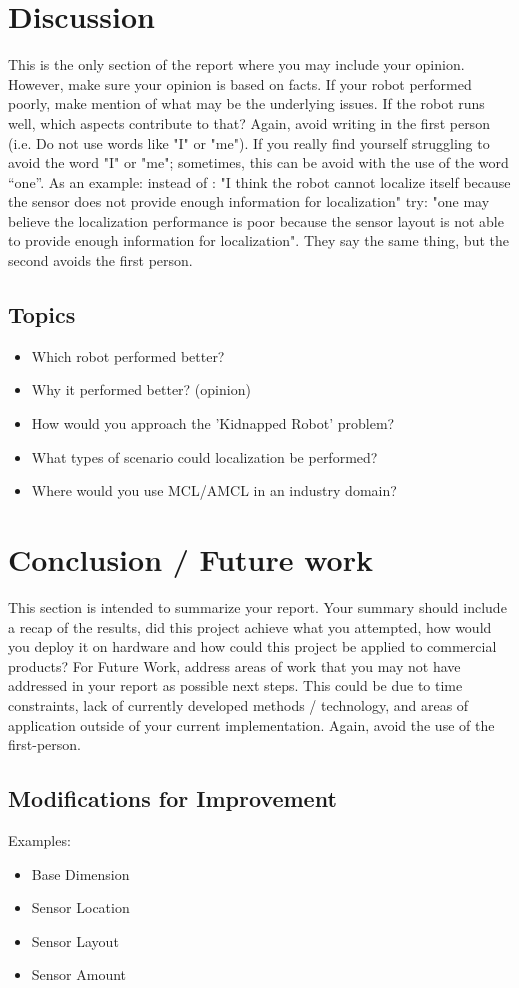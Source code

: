 \documentclass[10pt,journal,compsoc]{IEEEtran}
\begin{document}
\section{Discussion}
This is the only section of the report where you may include your opinion. However, make sure your opinion is based on facts. If your robot performed poorly, make mention of what may be the underlying issues. If the robot runs well, which aspects contribute to that? Again, avoid writing in the first person (i.e. Do not use words like "I" or "me"). If you really find yourself struggling to avoid the word "I" or "me"; sometimes, this can be avoid with the use of the word “one”. As an example: instead of : "I think the robot cannot localize itself because the sensor does not provide enough information for localization" try: "one may believe the localization performance is poor because the sensor layout is not able to provide enough information for localization". They say the same thing, but the second avoids the first person. 

\subsection{Topics}
\begin{itemize}
\item Which robot performed better?
\item Why it performed better? (opinion)
\item How would you approach the 'Kidnapped Robot' problem?
\item What types of scenario could localization be performed?
\item Where would you use MCL/AMCL in an industry domain?
\end {itemize}

\section{Conclusion / Future work}
This section is intended to summarize your report. Your summary should include a recap of the results, did this project achieve what you attempted, how would you deploy it on hardware and how could this project be applied to commercial products? 
For Future Work, address areas of work that you may not have addressed in your report as possible next steps. This could be due to time constraints, lack of currently developed methods / technology, and areas of application outside of your current implementation. Again, avoid the use of the first-person.

\subsection{Modifications for Improvement}
Examples:
\begin{itemize}
\item Base Dimension
\item Sensor Location
\item Sensor Layout
\item Sensor Amount
\end{itemize}

\cite{lamport1994latex}




\end{document}
